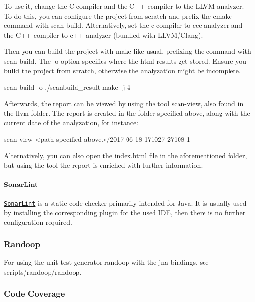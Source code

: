To use it, change the C compiler and the C++ compiler to the L\+L\+VM analyzer. To do this, you can configure the project from scratch and prefix the cmake command with {\ttfamily scan-\/build}. Alternatively, set the c compiler to {\ttfamily ccc-\/analyzer} and the C++ compiler to {\ttfamily c++-\/analyzer} (bundled with L\+L\+V\+M/\+Clang).

Then you can build the project with {\ttfamily make} like usual, prefixing the command with {\ttfamily scan-\/build}. The {\ttfamily -\/o} option specifies where the html results get stored. Ensure you build the project from scratch, otherwise the analyzation might be incomplete. \begin{DoxyVerb}scan-build -o ./scanbuild_result make -j 4
\end{DoxyVerb}


Afterwards, the report can be viewed by using the tool {\ttfamily scan-\/view}, also found in the llvm folder. The report is created in the folder specified above, along with the current date of the analyzation, for instance\+: \begin{DoxyVerb}scan-view <path specified above>/2017-06-18-171027-27108-1
\end{DoxyVerb}


Alternatively, you can also open the {\ttfamily index.\+html} file in the aforementioned folder, but using the tool the report is enriched with further information.

\paragraph*{Sonar\+Lint}

\href{http://www.sonarlint.org/}{\tt Sonar\+Lint} is a static code checker primarily intended for Java. It is usually used by installing the corresponding plugin for the used I\+DE, then there is no further configuration required.

\subsubsection*{Randoop}

For using the unit test generator randoop with the jna bindings, see {\ttfamily scripts/randoop/randoop}.

\subsubsection*{Code Coverage}

